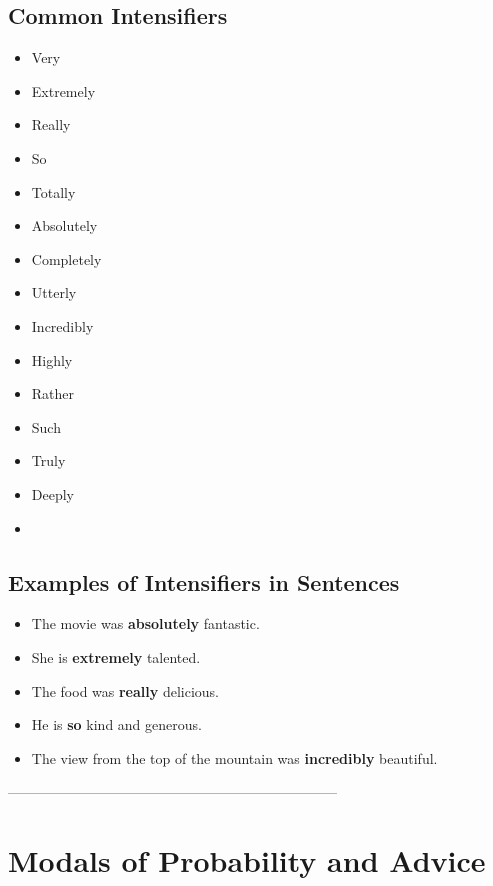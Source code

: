 \subsection{Common Intensifiers}
\begin{itemize}
    \item Very
    \item Extremely
    \item Really
    \item So
    \item Totally
    \item Absolutely
    \item Completely
    \item Utterly
    \item Incredibly
    \item Highly
    \item Rather
    \item Such
    \item Truly
    \item Deeply
    \item 
\end{itemize}


\subsection{Examples of Intensifiers in Sentences}
\begin{itemize}
    \item The movie was \textbf{absolutely} fantastic.
    \item She is \textbf{extremely} talented.
    \item The food was \textbf{really} delicious.
    \item He is \textbf{so} kind and generous.
    \item The view from the top of the mountain was \textbf{incredibly} beautiful.
\end{itemize}



-----------------------------------------------------------------------


\section{Modals of Probability and Advice}

